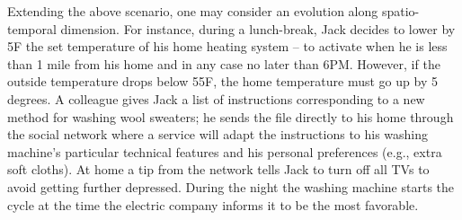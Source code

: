 
 Extending the above scenario, one may consider an evolution along spatio-temporal dimension. For instance, during a lunch-break, Jack decides to lower by 5F the set temperature of his home heating system – to activate when he is less than 1 mile from his home and in any case no later than 6PM. However, if the outside temperature drops below 55F, the home temperature must go up by 5 degrees. A colleague gives Jack a list of instructions corresponding to a new method for washing wool sweaters; he  sends the file directly to his home through the social network where a service will adapt the instructions to his washing machine’s particular technical features and his personal preferences (e.g., extra soft cloths). %
  At home a tip from the network tells Jack to turn off all TVs to avoid getting further depressed. During the night the washing machine starts the cycle at the time the electric company informs it to be the most favorable.

